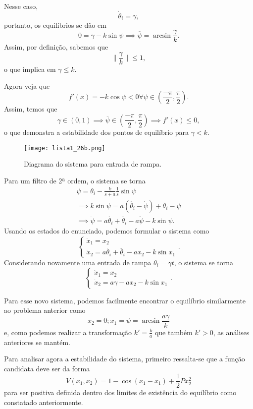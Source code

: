 \documentclass[a4paper]{report}
\begin{document}

Nesse caso, \[
\dot{\theta}_i = \gamma
,\] portanto, os equilíbrios se dão em \[
0 = \gamma - k \sin\psi \implies \overline{\psi} = \arcsin \frac{\gamma}{k}
.\] Assim, por definição, sabemos que  \[
\|\frac{\gamma}{k}\| \le 1 
,\] o que implica em $\gamma \le k$.

Agora veja que \[
    f'(x) = -k\cos\psi < 0 \forall \psi \in \left( \frac{-\pi}{2}, \frac{\pi}{2} \right) 
.\] Assim, temos que \[
\gamma \in (0,1) \implies \overline{\psi} \in \left( \frac{-\pi}{2}, \frac{\pi}{2} \right) \implies f'(x) \le 0
,\] o que demonstra a estabilidade dos pontos de equilíbrio para $\gamma < k$.

\begin{figure}[H]
    \centering
    \texttt{[image: lista1\_26b.png]}
    \caption{Diagrama do sistema para entrada de rampa.}
    \label{fig:lista1_26b-png}
\end{figure}


Para um filtro de 2ª ordem, o sistema se torna
\begin{align*}
\psi = \theta_i - \frac{k}{s+a}\frac{1}{s}\sin\psi \\
\implies k \sin\psi = a\left( \dot{\theta_i} - \dot{\psi} \right) + \ddot{\theta_i} - \ddot{\psi} \\
\implies \ddot{\psi} = a\dot{\theta_i} + \ddot{\theta_i}	- a\dot{\psi} -k\sin\psi
.\end{align*}
Usando os estados do enunciado, podemos formular o sistema como \[
\begin{cases}
    \dot{x}_1 = x_2 \\
    \dot{x}_2 = a\dot{\theta_i} + \ddot{\theta_i} - ax_2 -k\sin x_1
\end{cases}
.\] Considerando novamente uma entrada de rampa $\theta_i = \gamma t$, o sistema se torna  \[
\begin{cases}
    \dot{x}_1 = x_2 \\
    \dot{x}_2 = a\gamma - ax_2 -k\sin x_1
\end{cases}
.\] 

Para esse novo sistema, podemos facilmente encontrar o equilíbrio similarmente ao problema anterior como \[
x_2 = 0; x_1 = \psi = \arcsin \frac{a\gamma}{k}
\] e, como podemos realizar a transformação $k' = \frac{k}{a}$ que também $k'>0$, as análises anteriores se mantém.

Para analisar agora a estabilidade do sistema, primeiro ressalta-se que a função candidata deve ser da forma \[
    V(x_1,x_2) = 1 - \cos\left( x_1-\overline{x_1} \right) + \frac{1}{2}Px_2^2
\] para ser positiva definida dentro dos limites de existência do equilíbrio como constatado anteriormente.
\end{document}
